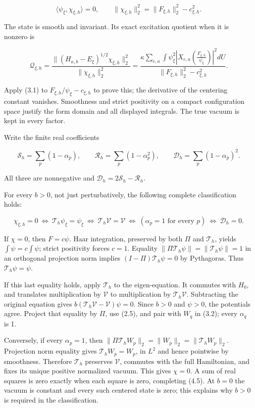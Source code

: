 \documentclass[
  11pt,
]{article}
\begin{document}
\[
\langle\psi_\xi,\chi_{\xi,h}\rangle=0,\qquad
\|\chi_{\xi,h}\|_2^2=\|F_{\xi,h}\|_2^2-c_{\xi,h}^2.
\tag{4.2}
\]

The state is smooth and invariant. Its exact excitation quotient when it
is nonzero is

\[
\boxed{\mathcal Q_{\xi,h}
=\frac{\|(H_{\kappa,b}-E_\xi)^{1/2}\chi_{\xi,h}\|_2^2}
{\|\chi_{\xi,h}\|_2^2}
=\frac{\displaystyle\kappa\sum_{e,a}\int\psi_\xi^2
\left|X_{e,a}\left(\frac{F_{\xi,h}}{\psi_\xi}\right)\right|^2dU}
{\displaystyle\|F_{\xi,h}\|_2^2-c_{\xi,h}^2}.}
\tag{4.3}
\]

Apply (3.1) to \(F_{\xi,h}/\psi_\xi-c_{\xi,h}\) to prove this; the
derivative of the centering constant vanishes. Smoothness and strict
positivity on a compact configuration space justify the form domain and
all displayed integrals. The true vacuum is kept in every factor.

Write the finite real coefficients

\[
\mathcal S_h=\sum_p(1-\alpha_p),\qquad
\mathcal R_h=\sum_p(1-\alpha_p^2),\qquad
\mathcal D_h=\sum_p(1-\alpha_p)^2.
\tag{4.4}
\]

All three are nonnegative and
\(\mathcal D_h=2\mathcal S_h-\mathcal R_h\).

For every \(b>0\), not just perturbatively, the following complete
classification holds:

\[
\boxed{
\chi_{\xi,h}=0
\ \Longleftrightarrow\ \mathcal T_h\psi_\xi=\psi_\xi
\ \Longleftrightarrow\ \mathcal T_h\mathcal V=\mathcal V
\ \Longleftrightarrow\ (\alpha_p=1\text{ for every }p)
\ \Longleftrightarrow\ \mathcal D_h=0.}
\tag{4.5}
\]

If \(\chi=0\), then \(F=c\psi\). Haar integration, preserved by both
\(\Pi\) and \(\mathcal T_h\), yields \(\int\psi=c\int\psi\); strict
positivity forces \(c=1\). Equality
\(\|\Pi\mathcal T_h\psi\|=\|\mathcal T_h\psi\|=1\) in an orthogonal
projection norm implies \((I-\Pi)\mathcal T_h\psi=0\) by Pythagoras.
Thus \(\mathcal T_h\psi=\psi\).

If this last equality holds, apply \(\mathcal T_h\) to the
eigen-equation. It commutes with \(H_0\), and translates multiplication
by \(\mathcal V\) to multiplication by \(\mathcal T_h\mathcal V\).
Subtracting the original equation gives
\(b(\mathcal T_h\mathcal V-\mathcal V)\psi=0\). Since \(b>0\) and
\(\psi>0\), the potentials agree. Project that equality by \(\Pi\), use
(2.5), and pair with \(W_q\) in (3.2); every \(\alpha_q\) is 1.

Conversely, if every \(\alpha_p=1\), then
\(\|\Pi\mathcal T_hW_p\|_2=\|W_p\|_2=\|\mathcal T_hW_p\|_2\). Projection
norm equality gives \(\mathcal T_hW_p=W_p\), in \(L^2\) and hence
pointwise by smoothness. Therefore \(\mathcal T_h\) preserves
\(\mathcal V\), commutes with the full Hamiltonian, and fixes its unique
positive normalized vacuum. This gives \(\chi=0\). A sum of real squares
is zero exactly when each square is zero, completing (4.5). At \(b=0\)
the vacuum is constant and every such centered state is zero; this
explains why \(b>0\) is required in the classification.
\end{document}
